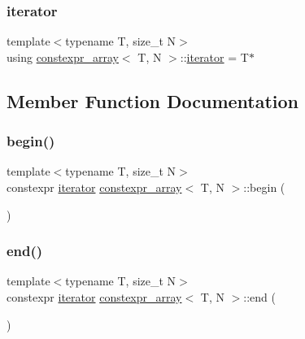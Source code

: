 \subsubsection{\texorpdfstring{iterator}{iterator}}
{\footnotesize\ttfamily template$<$typename T, size\+\_\+t N$>$ \\
using \hyperlink{classconstexpr__array}{constexpr\+\_\+array}$<$ T, N $>$\+::\hyperlink{classconstexpr__array_a649b2a387e5109c7750c536a3518ab3e}{iterator} =  T$\ast$}



\subsection{Member Function Documentation}
\mbox{\label{classconstexpr__array_a405f736c800b2cd4527d1b574a56e5af}} 
\subsubsection{\texorpdfstring{begin()}{begin()}}
{\footnotesize\ttfamily template$<$typename T, size\+\_\+t N$>$ \\
constexpr \hyperlink{classconstexpr__array_a649b2a387e5109c7750c536a3518ab3e}{iterator} \hyperlink{classconstexpr__array}{constexpr\+\_\+array}$<$ T, N $>$\+::begin (\begin{DoxyParamCaption}{ }\end{DoxyParamCaption})\hspace{0.3cm}{\ttfamily [inline]}}

\mbox{\label{classconstexpr__array_ad3680b32e76738116dbb9c0efeca5bd4}} 
\subsubsection{\texorpdfstring{end()}{end()}}
{\footnotesize\ttfamily template$<$typename T, size\+\_\+t N$>$ \\
constexpr \hyperlink{classconstexpr__array_a649b2a387e5109c7750c536a3518ab3e}{iterator} \hyperlink{classconstexpr__array}{constexpr\+\_\+array}$<$ T, N $>$\+::end (\begin{DoxyParamCaption}{ }\end{DoxyParamCaption})\hspace{0.3cm}{\ttfamily [inline]}}

